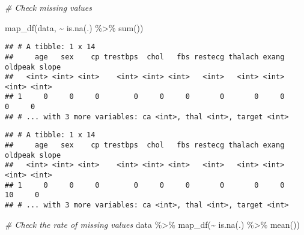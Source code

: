\documentclass[
]{book}
\newenvironment{Shaded}{\begin{snugshade}}{\end{snugshade}}
\newcommand{\AttributeTok}[1]{\textcolor[rgb]{0.77,0.63,0.00}{#1}}
\newcommand{\CommentTok}[1]{\textcolor[rgb]{0.56,0.35,0.01}{\textit{#1}}}
\newcommand{\ConstantTok}[1]{\textcolor[rgb]{0.00,0.00,0.00}{#1}}
\newcommand{\DecValTok}[1]{\textcolor[rgb]{0.00,0.00,0.81}{#1}}
\newcommand{\FunctionTok}[1]{\textcolor[rgb]{0.00,0.00,0.00}{#1}}
\newcommand{\NormalTok}[1]{#1}
\newcommand{\OtherTok}[1]{\textcolor[rgb]{0.56,0.35,0.01}{#1}}
\newcommand{\SpecialCharTok}[1]{\textcolor[rgb]{0.00,0.00,0.00}{#1}}
\begin{document}
\begin{Shaded}
\begin{Highlighting}[]
\CommentTok{\# Check missing values}

\FunctionTok{map\_df}\NormalTok{(data, }\SpecialCharTok{\textasciitilde{}} \FunctionTok{is.na}\NormalTok{(.) }\SpecialCharTok{\%\textgreater{}\%} \FunctionTok{sum}\NormalTok{())}
\end{Highlighting}
\end{Shaded}

\begin{verbatim}
## # A tibble: 1 x 14
##     age   sex    cp trestbps  chol   fbs restecg thalach exang oldpeak slope
##   <int> <int> <int>    <int> <int> <int>   <int>   <int> <int>   <int> <int>
## 1     0     0     0        0     0     0       0       0     0       0     0
## # ... with 3 more variables: ca <int>, thal <int>, target <int>
\end{verbatim}

\begin{Shaded}
\end{Shaded}

\begin{verbatim}
## # A tibble: 1 x 14
##     age   sex    cp trestbps  chol   fbs restecg thalach exang oldpeak slope
##   <int> <int> <int>    <int> <int> <int>   <int>   <int> <int>   <int> <int>
## 1     0     0     0        0     0     0       0       0     0      10     0
## # ... with 3 more variables: ca <int>, thal <int>, target <int>
\end{verbatim}

\begin{Shaded}
\begin{Highlighting}[]
\CommentTok{\# Check the rate of missing values}
\NormalTok{data }\SpecialCharTok{\%\textgreater{}\%}
  \FunctionTok{map\_df}\NormalTok{(}\SpecialCharTok{\textasciitilde{}} \FunctionTok{is.na}\NormalTok{(.) }\SpecialCharTok{\%\textgreater{}\%} \FunctionTok{mean}\NormalTok{())}
\end{Highlighting}
\end{Shaded}
\end{document}
